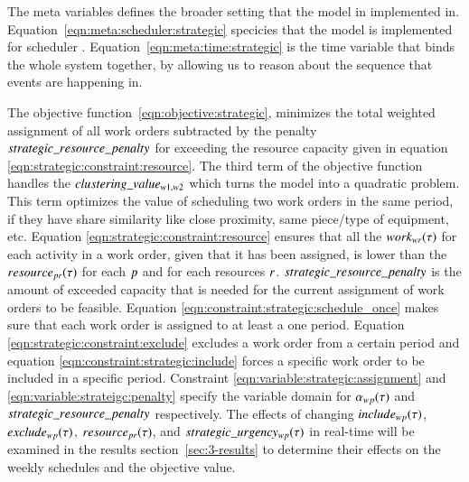 The meta variables defines the broader setting that the model in implemented in.
Equation~\eqref{eqn:meta:scheduler:strategic} specicies that the model is
implemented for scheduler \ElementScheduler. 
Equation~\eqref{eqn:meta:time:strategic} is the time variable that binds the whole
system together, by allowing us to reason about the sequence that events are 
happening in.

The objective function~\eqref{eqn:objective:strategic}, minimizes the
total weighted assignment of all work orders subtracted by the penalty $
strategic\_resource\_penalty$ for exceeding the resource capacity given in
equation \eqref{eqn:strategic:constraint:resource}. The third term of the
objective function handles the $clustering\_value_{w1, w2}$ which turns the model into
a quadratic problem. This term optimizes the value of scheduling two work orders
in the same period, if they have share similarity like close proximity, same
piece/type of equipment, etc. Equation \eqref{eqn:strategic:constraint:resource}
ensures that all the $work_{wr}(\tau)$ for each activity in
a work order, given that it has been assigned, is lower than the $
\ParStrategicResource$ for each $p$ and for each resources $
r$. $strategic\_resource\_penalty$ is the amount of exceeded
capacity that is needed for the current assignment of work orders to be
feasible. Equation \eqref{eqn:constraint:strategic:schedule_once} makes
sure that each work order is assigned to at least a one period. Equation
\eqref{eqn:strategic:constraint:exclude} excludes a work order from a
certain period and equation \eqref{eqn:constraint:strategic:include}
forces a specific work order to be included in a specific
period. Constraint \eqref{eqn:variable:strategic:assignment} and
\eqref{eqn:variable:strateigc:penalty} specify the variable domain for $
\alpha_{wp}(\tau)$ and
$ strategic\_resource\_penalty$ respectively. The effects of changing $
include_{wp}(\tau)$, $exclude_{wp}(\tau)$, $\ParStrategicResource$,
and $ strategic\_urgency_{w p}(\tau)$ in real-time will be examined in the results
section~\ref{sec:3-results} to determine their effects on the weekly schedules
and the objective value.
